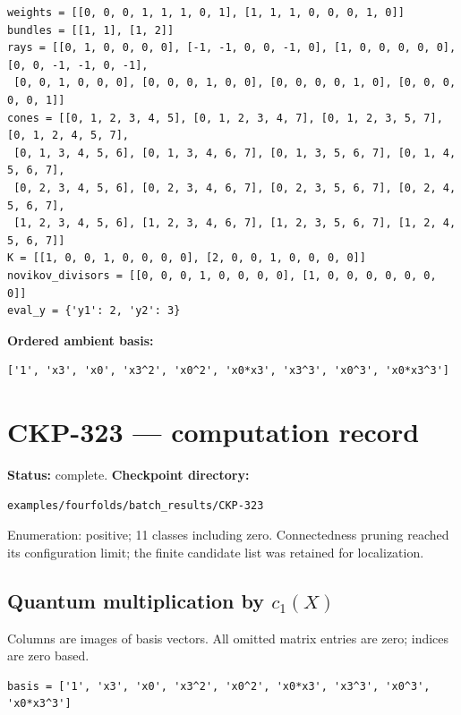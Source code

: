 \documentclass[10pt,a4paper]{article}
\begin{document}
\begin{lstlisting}
weights = [[0, 0, 0, 1, 1, 1, 0, 1], [1, 1, 1, 0, 0, 0, 1, 0]]
bundles = [[1, 1], [1, 2]]
rays = [[0, 1, 0, 0, 0, 0], [-1, -1, 0, 0, -1, 0], [1, 0, 0, 0, 0, 0], [0, 0, -1, -1, 0, -1],
 [0, 0, 1, 0, 0, 0], [0, 0, 0, 1, 0, 0], [0, 0, 0, 0, 1, 0], [0, 0, 0, 0, 0, 1]]
cones = [[0, 1, 2, 3, 4, 5], [0, 1, 2, 3, 4, 7], [0, 1, 2, 3, 5, 7], [0, 1, 2, 4, 5, 7],
 [0, 1, 3, 4, 5, 6], [0, 1, 3, 4, 6, 7], [0, 1, 3, 5, 6, 7], [0, 1, 4, 5, 6, 7],
 [0, 2, 3, 4, 5, 6], [0, 2, 3, 4, 6, 7], [0, 2, 3, 5, 6, 7], [0, 2, 4, 5, 6, 7],
 [1, 2, 3, 4, 5, 6], [1, 2, 3, 4, 6, 7], [1, 2, 3, 5, 6, 7], [1, 2, 4, 5, 6, 7]]
K = [[1, 0, 0, 1, 0, 0, 0, 0], [2, 0, 0, 1, 0, 0, 0, 0]]
novikov_divisors = [[0, 0, 0, 1, 0, 0, 0, 0], [1, 0, 0, 0, 0, 0, 0, 0]]
eval_y = {'y1': 2, 'y2': 3}
\end{lstlisting}

\textbf{Ordered ambient basis:}
\begin{lstlisting}
['1', 'x3', 'x0', 'x3^2', 'x0^2', 'x0*x3', 'x3^3', 'x0^3', 'x0*x3^3']
\end{lstlisting}

\clearpage\section*{CKP-323 --- computation record}
\textbf{Status:} complete.
\textbf{Checkpoint directory:}
\begin{lstlisting}
examples/fourfolds/batch_results/CKP-323
\end{lstlisting}

Enumeration: positive; 11 classes including zero.
Connectedness pruning reached its configuration limit; the finite candidate list was retained for localization.
\subsection*{Quantum multiplication by $c_1(X)$}
Columns are images of basis vectors. All omitted matrix entries are zero; indices are zero based.

\begin{lstlisting}
basis = ['1', 'x3', 'x0', 'x3^2', 'x0^2', 'x0*x3', 'x3^3', 'x0^3', 'x0*x3^3']
\end{lstlisting}
\end{document}
